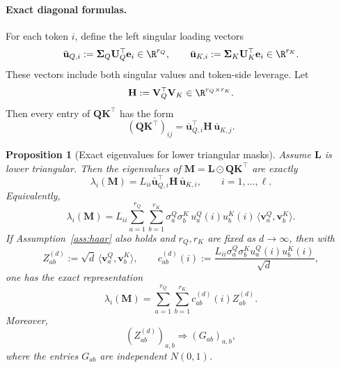 \documentclass{article}
\newcommand{\weak}{\Rightarrow}
\newcommand{\hadamard}{\mathbin{\odot}}
\newcommand{\bM}{\mathbf{M}}
\newcommand{\bL}{\mathbf{L}}
\newcommand{\bQ}{\mathbf{Q}}
\newcommand{\bK}{\mathbf{K}}
\newcommand{\bU}{\mathbf{U}}
\newcommand{\bV}{\mathbf{V}}
\newcommand{\be}{\mathbf{e}}
\newcommand{\bu}{\mathbf{u}}
\newcommand{\bv}{\mathbf{v}}
\newcommand{\bH}{\mathbf{H}}
\newcommand{\bSigma}{\boldsymbol{\Sigma}}
\newtheorem{proposition}[theorem]{Proposition}
\theoremstyle{remark}
\begin{document}
\paragraph{Exact diagonal formulas.}
For each token $i$, define the left singular loading vectors
\begin{equation}
    \bar{\bu}_{Q,i}
    :=
    \bSigma_Q\bU_Q^\top\be_i\in\R^{r_Q},
    \qquad
    \bar{\bu}_{K,i}
    :=
    \bSigma_K\bU_K^\top\be_i\in\R^{r_K}.
    \label{eq:bar-loadings}
\end{equation}
These vectors include both singular values and token-side leverage.  Let
\begin{equation}
    \bH:=\bV_Q^\top\bV_K\in\R^{r_Q\times r_K}.
    \label{eq:H}
\end{equation}
Then every entry of $\bQ\bK^\top$ has the form
\begin{equation}
    (\bQ\bK^\top)_{ij}
    =
    \bar{\bu}_{Q,i}^{\top}\bH\,\bar{\bu}_{K,j}.
    \label{eq:entry-form}
\end{equation}

\begin{proposition}[Exact eigenvalues for lower triangular masks]
Assume $\bL$ is lower triangular.  Then the eigenvalues of
$\bM=\bL\hadamard\bQ\bK^\top$ are exactly
\begin{equation}
    \lambda_i(\bM)
    =
    L_{ii}\bar{\bu}_{Q,i}^{\top}\bH\,\bar{\bu}_{K,i},
    \qquad i=1,\ldots,\ell.
    \label{eq:eigenvalues-exact}
\end{equation}
Equivalently,
\begin{equation}
    \lambda_i(\bM)
    =
    L_{ii}
    \sum_{a=1}^{r_Q}\sum_{b=1}^{r_K}
    \sigma^Q_a\sigma^K_b\,
    u^Q_a(i)u^K_b(i)\,
    \langle\bv^Q_a,\bv^K_b\rangle .
    \label{eq:eigenvalue-expansion}
\end{equation}
If Assumption~\ref{ass:haar} also holds and $r_Q,r_K$ are fixed as
$d\to\infty$, then with
\[
    Z_{ab}^{(d)}
    :=
    \sqrt d\,\langle\bv^Q_a,\bv^K_b\rangle,
    \qquad
    c_{ab}^{(d)}(i)
    :=
    \frac{L_{ii}\sigma^Q_a\sigma^K_bu^Q_a(i)u^K_b(i)}{\sqrt d},
\]
one has the exact representation
\begin{equation}
    \lambda_i(\bM)
    =
    \sum_{a=1}^{r_Q}\sum_{b=1}^{r_K}
    c_{ab}^{(d)}(i)Z_{ab}^{(d)}.
    \label{eq:fixed-rank-exact-characterization}
\end{equation}
Moreover,
\[
    (Z_{ab}^{(d)})_{a,b}\weak (G_{ab})_{a,b},
\]
where the entries $G_{ab}$ are independent $N(0,1)$.
\label{prop:exact-lower-triangular-eigenvalues}
\end{proposition}
\end{document}
